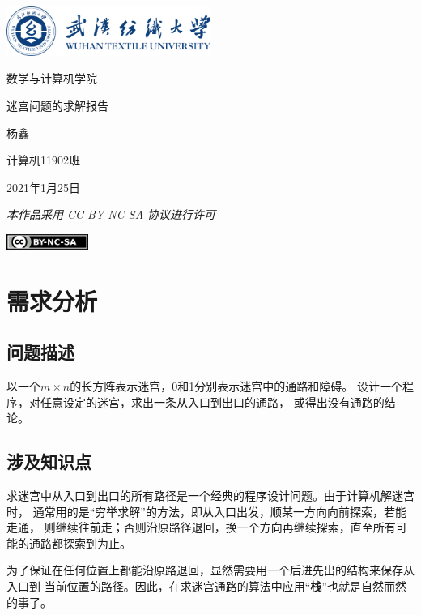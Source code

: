 \documentclass{ctexart}
\newcommand{\makecover}[4]{
    \begin{titlepage}
        \centering
        \includegraphics[width=0.5\textwidth]{logo.png}\par
        \vspace{1cm}
        {\kaishu\ziju{0.1}\Huge 数学与计算机学院}\par
        \vspace{5.5cm}
        {\heiti\ziju{0.1}\zihao{0} #1}\par
        \vspace{5.5cm}
        {\kaishu\ziju{0.1}\Huge #2}\par
        \vspace{0.7cm}
        {\kaishu\Large #3}\par
        \vspace{1em}
        {\kaishu\large #4}\par
        \vspace{4em}
        {\itshape 本作品采用 \href{https://creativecommons.org/licenses/by-nc-sa/4.0/}{CC-BY-NC-SA} 协议进行许可}\par
        \vspace{1em}
        \includegraphics[width=0.2\textwidth]{cc-by-nc-sa.png}
    \end{titlepage}
}
\begin{document}
    \makecover{迷宫问题的求解报告}{杨鑫}{计算机11902班}{2021年1月25日}

    \section{需求分析}

    \subsection{问题描述}

    以一个$m\times n$的长方阵表示迷宫，0和1分别表示迷宫中的通路和障碍。
    设计一个程序，对任意设定的迷宫，求出一条从入口到出口的通路，
    或得出没有通路的结论。

    \subsection{涉及知识点}
    求迷宫中从入口到出口的所有路径是一个经典的程序设计问题。由于计算机解迷宫时，
    通常用的是“穷举求解”的方法，即从入口出发，顺某一方向向前探索，若能走通，
    则继续往前走；否则沿原路径退回，换一个方向再继续探索，直至所有可能的通路都探索到为止。
    
    为了保证在任何位置上都能沿原路退回，显然需要用一个后进先出的结构来保存从入口到
    当前位置的路径。因此，在求迷宫通路的算法中应用“{\textbf 栈}”也就是自然而然的事了。
    
\end{document}
